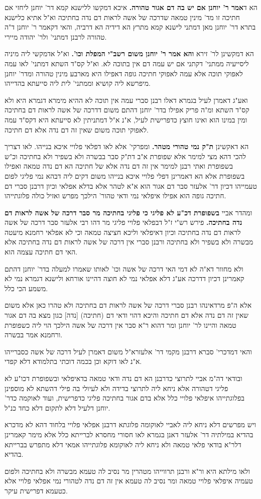 \documentclass[12pt, openany]{book}
\newcommand{\sethebfont}{
\fontsize{10.5pt}{21.0pt} \selectfont
}
\newcommand{\twocol}[1]{
	{\sethebfont \begin{multicols}{2}
			#1
	\end{multicols}}	
}
\begin{document}
\twocol{ הא ד\textbf{אמר ר' יוחנן אם יש בה דם אגור טהורה.}  איכא דמקשו ללישנא קמא דר' יוחנן ליחזי אם חתיכה זו מד' מינין טמאה שדרכה של אשה לראות דם נדה בחתיכה וא"ל אתיא כלישנא בתרא דר' יוחנן מאן דמתני לישנא קמא מתרץ הא דידיה הא דרביה, והאי דקאמר ר' יוחנן ד"ה טהורה לרבנן דמתני' ולר' יהודה מיירי. 
\par הא דמקשינן לר' זירא \textbf{והא אמר ר' יוחנן משום רשב"י המפלת וכו'.}  וא"ל אדמקשי ליה מיניה ליסייעיה ממתני' דקתני אם יש עמה דם אין בתוכה לא. וא"ל קס"ד השתא דמתני' לאו עמה לאפוקי תוכה אלא עמה לאפוקי חתיכה גופה דאפילו היא מארבע מינין טהורה ומדר' יוחנן מיפרשא ליה קושיא וממתני' לית ליה סייעתא בהדייהו.\par  ואע"ג דאמרן לעיל בגמרא דאלו רבנן סברי עמה אין תוכה לא ההיא מימרא דגמרא היא ולא קס"ד השתא ומ"ה פריק אפילו בדר' יוחנן דהתם משום דדרכה של אשה לראות דם בחתיכה ומין במינו הוא ואינו חוצץ כדפרישית לעיל, א"נ א"ל דמתניתין לא סייעתא היא דקס"ד עמה לאפוקי תוכה משום שאין זה דם נדה אלא דם חתיכה. 
\par הא דאקשינן \textbf{ת"ק נמי טהורי מטהר.}  ומפרקי' אלא לאו דפלאי פלויי איכא בנייהו. לאו דצריך להכי דהא מצי למימר אלא שפופרת א"ב דת"ק סבר בבשרה ולא בשפיר ולא בחתיכה וכ"ש בשפופרת ואתי רבנן למימר אין זה דם נדה אלא של חתיכה הא דם נדה טמאה ואפילו בשפופרת אלא הא דאמרינן דפלי פלויי איכא בנייהו משום דקים ליה דבהא נמי פליגי לפום טעמייהו דכיון דר' אלעזר סבר דם אגור הוא א"א לטהר אלא בדלא אפלאי וכיון דרבנן סברי דם חתיכה גופה הוא אפילו איפלאי נמי ודאי טהור' הילכך מפרש ואזיל כולה פלוגתייהו. 
\par ומהדר אביי \textbf{בשפופרת דכ"ע לא פליגי כי פליגי בחתיכה מר סבר דרכה של אשה לראות דם נדה בחתיכה.}  פירש רש"י ז"ל דבפלאי פלויי פליגי מר דהו רבי אלעזר סבר דרכה של אשה לראות דם נדה בחתיכה וכיון דאיפלאי וליכא חציצה טמאה וכי לא אפלאי רחמנא מיעטה מבשרה ולא בשפיר ולא בחתיכה ורבנן סברי אין דרכה של אשה לראות דם נדה בחתיכה אלא האי דם חתיכה עצמה הוא.\par ולא מחוור דא"ה לא דמי האי דרכה של אשה וכו' לאותו שאמרו למעלה בדר' יוחנן דהתם קאמרינן דכיון דדרכה אע"ג דלא אפלאי נמי לא חוצה דהיינו אורחא ולישנא דגמרא נמי לא משמע הכי כלל.\par אלא ה"פ מרדאינהו רבנן סברי דרכה של אשה לראות דם בחתיכה ולא טהרו כאן אלא משום שאין זה דם נדה אלא דם חתיכה והיכא דהוי ודאי דם (חתיכה) [נדה] כגון מצא בה דם אגור טמאה והיינו לר' יוחנן ומר דהוא ר"א סבר אין דרכה של אשה הילכך הוי ליה כשפופרת ורחמנא אמר בבשרה.\par והאי דמדכרי' סברא דרבנן מקמי דר' אלעזרא"ל משום דאמרן לעיל דרכה של אשה כסברייהו א"נ לאו דוקא וכן בכמה דוכתי בתלמודא דלא קפדי.\par  ובודאי דה"מ אביי לתרוצי כדרבנן הא דם נדה ודאי טמאה בדאיפלאי ובשפופרת דכו"ע לא פליגי דטהורה אלא ניחא ליה לתרוצי בדידה ולא לעיולי בה פילי דהשתא לא מוספינן בפלוגתייהו איפלאי פלויי כלל אלא בדם אגור בחתיכה פליגי כדפרישית, ועוד לאוקמה כדר' יוחנן דלעיל דלא לתקום דלא כחד כנ"ל.\par ויש מפרשים דלא ניחא ליה לאביי לאוקומה פלוגתא דרבנן אפלאי פלויי בלחוד דהא לא מדכרא בהדיא במילתיה דר' אלעזר דאנן בגמרא לאו חסורי מחסרא לברייתא כלל אלא מימר קאמרינן דלר"א בודאי פלאי טמאה ולא ניחא ליה לאוקומא פלוגתייהו אמאי דלא מתפרש בברייתא בהדיא.\par  ולאו מילתא היא ור"א ורבנן תרווייהו מטהרין מר נסיב לה טעמא מבשרה ולא בחתיכה ולפום טעמיה איפלאי פלויי טמאה ומר נסיב לה טעמא אין זה דם נדה לטהורי נמי אפלאי פלויי אלא כטעמא דפרישית עיקר. 
}
\end{document}
